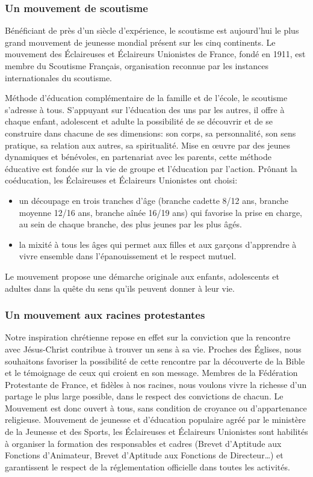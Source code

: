 \documentclass[titlepage,11pt,a4paper]{article}
\begin{document}
\subsubsection*{Un mouvement de scoutisme}

Bénéficiant de près d'un siècle d'expérience, le scoutisme est aujourd'hui le plus grand mouvement de jeunesse mondial présent sur les cinq continents. Le mouvement des Éclaireuses et Éclaireurs Unionistes de France, fondé en 1911, est membre du Scoutisme Français, organisation reconnue par les instances internationales du scoutisme.

Méthode d'éducation complémentaire de la famille et de l'école, le scoutisme s'adresse à tous. S'appuyant sur l'éducation des uns par les autres, il offre à chaque enfant, adolescent et adulte la possibilité de se découvrir et de se construire dans chacune de ses dimensions: son corps, sa personnalité, son sens pratique, sa relation aux autres, sa spiritualité. Mise en œuvre par des jeunes dynamiques et bénévoles, en partenariat avec les parents, cette méthode éducative est fondée sur la vie de groupe et l'éducation par l'action. Prônant la coéducation, les Éclaireuses et Éclaireurs Unionistes ont choisi:
\begin{itemize}
   \item un découpage en trois tranches d'âge (branche cadette 8/12 ans, branche moyenne 12/16 ans, branche aînée 16/19 ans) qui favorise la prise en charge, au sein de chaque branche,
      des plus jeunes par les plus âgés.
   \item la mixité à tous les âges qui permet aux filles et aux garçons d'apprendre à vivre ensemble dans l'épanouissement et le respect mutuel.
\end{itemize}

Le mouvement propose une démarche originale aux enfants, adolescents et adultes dans la quête du sens qu'ils peuvent donner à leur vie.

\subsubsection*{Un mouvement aux racines protestantes}
Notre inspiration chrétienne repose en effet sur la conviction que la rencontre avec Jésus-Christ
contribue à trouver un sens à sa vie.  Proches des Églises, nous souhaitons favoriser la possibilité
de cette rencontre par la découverte de la Bible et le témoignage de ceux qui croient en son message.
Membres de la Fédération Protestante de France, et fidèles à nos racines, nous voulons vivre la richesse
d'un partage le plus large possible, dans le respect des convictions de chacun. Le Mouvement est donc ouvert à tous,
sans condition de croyance ou d'appartenance religieuse.  Mouvement de jeunesse et d'éducation populaire
agréé par le ministère de la Jeunesse et des Sports, les Éclaireuses et Éclaireurs Unionistes sont habilités
à organiser la formation des responsables et cadres (Brevet d’Aptitude aux Fonctions d’Animateur,
Brevet d’Aptitude aux Fonctions de Directeur…) et garantissent le respect de la réglementation officielle dans toutes les activités.
\end{document}
